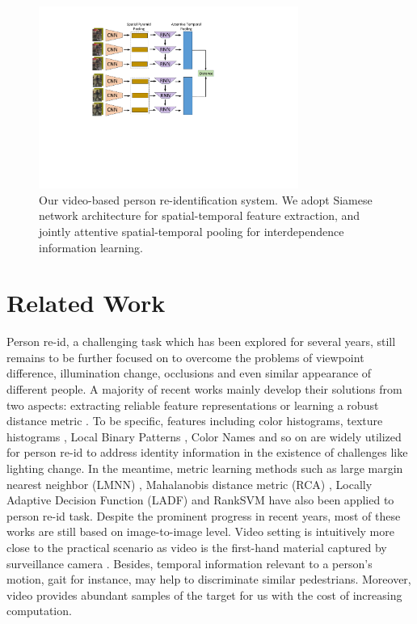 \documentclass[10pt,twocolumn,letterpaper]{article}
\begin{document}

\begin{figure}[!t]
\centering
\includegraphics[width=8.5cm]{Main.pdf}
\caption{Our video-based person re-identification system. We adopt Siamese network architecture for spatial-temporal feature extraction, and jointly attentive spatial-temporal pooling for interdependence information learning.}
\label{fig_main}
\end{figure}

\section{Related Work}
Person re-id, a challenging task which has been explored for several years, still remains to be further focused on to overcome the problems of viewpoint difference, illumination change, occlusions and even similar appearance of different people. A majority of recent works mainly develop their solutions from two aspects: extracting reliable feature representations \cite{Wang,Farenzena,Kviatovsky,Ma,Liu,mid_level_filter} or learning a robust distance metric \cite{Liao,R_D_C,M_metric,kernal_metric,G_M_P,Salience_matching,metric_ensemble,L_A_D_F}. To be specific, features including color histograms\cite{Salience_matching,kernal_metric}, texture histograms \cite{Farenzena}, Local Binary Patterns \cite{kernal_metric} , Color Names \cite{Zheng} and so on are widely utilized for person re-id to address identity information in the existence of challenges like lighting change. In the meantime, metric learning methods such as large margin nearest neighbor (LMNN) \cite{LMNN}, Mahalanobis distance metric (RCA) \cite{M_metric}, Locally Adaptive Decision Function (LADF) \cite{L_A_D_F} and RankSVM \cite{mid_level_filter} have also been applied to person re-id task. Despite the prominent progress in recent years, most of these works are still based on image-to-image level. Video setting is intuitively more close to the practical scenario as video is the first-hand material captured by surveillance camera \cite{Cheng_2014_CVPR,DBLP:conf/icmcs/ChengBFFPZ14}. Besides, temporal information relevant to a person's motion, gait for instance, may help to discriminate similar pedestrians. Moreover, video provides abundant samples of the target for us with the cost of increasing computation.
\end{document}

